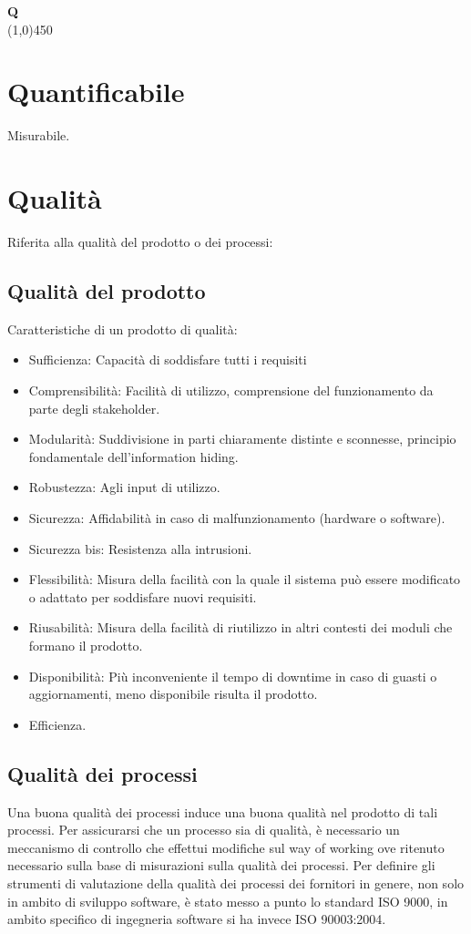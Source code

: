 	{\Huge{\textbf{Q}}} \\
	\line(1,0){450}
	
	\section{Quantificabile}
	\label{sec:quantificabile}
	Misurabile.
	
	\section{Qualità} 
	\label{sec:qualita}
	Riferita alla qualità del prodotto o dei processi:
	\subsection{Qualità del prodotto}
	Caratteristiche di un prodotto di qualità:
	\begin{itemize}  
	\item Sufficienza: Capacità di soddisfare tutti i requisiti
	\item Comprensibilità: Facilità di utilizzo, comprensione del funzionamento da parte degli stakeholder.
	\item Modularità: Suddivisione in parti chiaramente distinte e sconnesse, principio fondamentale dell'information hiding. 
	\item Robustezza: Agli input di utilizzo.
	\item Sicurezza: Affidabilità in caso di malfunzionamento (hardware o software).
	\item Sicurezza bis: Resistenza alla intrusioni. 
	\item Flessibilità: Misura della facilità con la quale il sistema può essere modificato o adattato per soddisfare nuovi requisiti.
	\item Riusabilità: Misura della facilità di riutilizzo in altri contesti dei moduli che formano il prodotto.
	\item Disponibilità: Più inconveniente il tempo di downtime in caso di guasti o aggiornamenti, meno disponibile risulta il prodotto.	
	\item Efficienza.
	\end{itemize}
	\subsection{Qualità dei processi}
	Una buona qualità dei processi induce una buona qualità nel prodotto di tali processi. Per assicurarsi che un processo sia di qualità, è necessario un meccanismo di controllo che effettui modifiche sul way of working ove ritenuto necessario sulla base di misurazioni sulla qualità dei processi. Per definire gli strumenti di valutazione della qualità dei processi dei fornitori in genere, non solo in ambito di sviluppo software, è stato messo a punto lo standard ISO 9000, in ambito specifico di ingegneria software si ha invece ISO 90003:2004.
	
